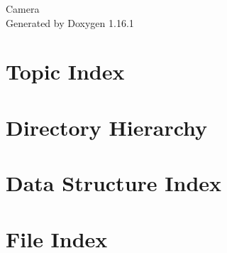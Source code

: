 \documentclass[twoside]{book}
\newcommand{\+}{\discretionary{\mbox{\scriptsize$\hookleftarrow$}}{}{}}
\newcommand{\clearemptydoublepage}{%
    \newpage{\pagestyle{empty}\cleardoublepage}%
  }
\begin{document}
  \raggedbottom
    \hypersetup{pageanchor=false,
                bookmarksnumbered=true,
                pdfencoding=unicode
               }
  \begin{titlepage}
  \vspace*{7cm}
  \begin{center}%
  {\Large Camera}\\
  \vspace*{1cm}
  {\large Generated by Doxygen 1.16.1}\\
  \end{center}
  \end{titlepage}
  \clearemptydoublepage
  \tableofcontents
  \clearemptydoublepage
  \hypersetup{pageanchor=true}


\chapter{Topic Index}

\chapter{Directory Hierarchy}

\chapter{Data Structure Index}

\chapter{File Index}

\end{document}
